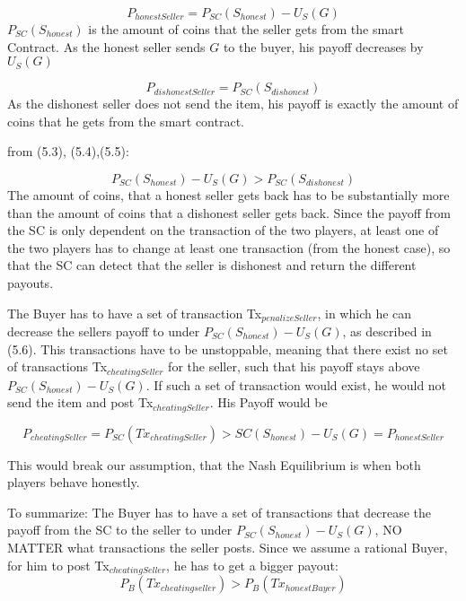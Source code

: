 \documentclass{cacthesis}
\begin{document}
\begin{equation}
    P_{honestSeller} = P_{SC}(S_{honest})- U_S(G)
\end{equation}
$P_{SC}(S_{honest})$ is the amount of coins that the seller gets from the smart Contract. As the honest seller sends $G$ to the buyer, his payoff decreases by $U_S(G)$

\begin{equation}
    P_{dishonestSeller} = P_{SC}(S_{dishonest})
\end{equation}
As the dishonest seller does not send the item, his payoff is exactly the amount of coins that he gets from the smart contract.

from (5.3), (5.4),(5.5):

\begin{equation}
   P_{SC}(S_{honest})- U_S(G) > P_{SC}(S_{dishonest})
\end{equation}
The amount of coins, that a honest seller gets back has to be substantially more than the amount of coins that a dishonest seller gets back.\newline
Since the payoff from the SC is only dependent on the transaction of the two players, at least one of the two players has to change at least one transaction (from the honest case), so that the SC can detect that the seller is dishonest and return the different payouts.\newline

The Buyer has to have a set of transaction Tx$_{penalizeSeller}$, in which he can decrease the sellers payoff to under $P_{SC}(S_{honest})- U_S(G)$, as described in (5.6).\newline
This transactions have to be unstoppable, meaning that there exist no set of transactions Tx$_{cheatingSeller}$ for the seller, such that his payoff stays above $P_{SC}(S_{honest})- U_S(G)$. \newline 
If such a set of transaction would exist, he would not send the item and post Tx$_{cheatingSeller}$. His Payoff would be 

\[P_{cheatingSeller} = P_{SC}(Tx_{cheatingSeller}) > {SC}(S_{honest})- U_S(G) =  P_{honestSeller}\]

This would break our assumption, that the Nash Equilibrium is when both players behave honestly.\newline

To summarize: The Buyer has to have a set of transactions that decrease the payoff from the SC to the seller to under $P_{SC}(S_{honest})- U_S(G)$, NO MATTER what transactions the seller posts.\newline
Since we assume a rational Buyer, for him to post Tx$_{cheatingSeller}$, he has to get a bigger payout:
\begin{equation}
    P_{B}(Tx_{cheatingseller}) > P_{B}(Tx_{honestBuyer})
\end{equation}
\end{document}
